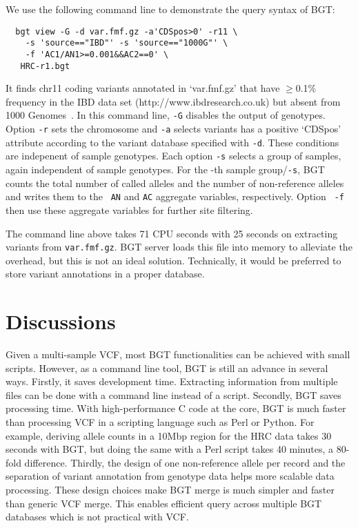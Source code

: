 \documentclass{bioinfo}
\begin{document}
We use the following command line to demonstrate the query syntax of BGT:
\begin{center}\footnotesize
\begin{verbatim}
  bgt view -G -d var.fmf.gz -a'CDSpos>0' -r11 \
    -s 'source=="IBD"' -s 'source=="1000G"' \
    -f 'AC1/AN1>=0.001&&AC2==0' \
   HRC-r1.bgt
\end{verbatim}
\end{center}
It finds chr11 coding variants annotated in `var.fmf.gz' that have $\ge$0.1\%
frequency in the IBD data set (http://www.ibdresearch.co.uk) but absent from
1000 Genomes~\citep{1000-Genomes-Project-Consortium:2012aa}. In this command line, {\tt -G} disables the output of genotypes.
Option {\tt -r} sets the chromosome and {\tt -a} selects variants has a
positive `CDSpos' attribute according to the variant database specified with
{\tt -d}.  These conditions are indepenent of sample genotypes. Each option
{\tt -s} selects a group of samples, again independent of sample genotypes.
For the -th sample group/{\tt -s}, BGT counts the total number of called
alleles and the number of non-reference alleles and writes them to the {\tt
AN\char35} and {\tt AC\char35} aggregate variables, respectively. Option {\tt
-f} then use these aggregate variables for further site filtering.

The command line above takes 71 CPU seconds with 25 seconds on extracting
variants from {\tt var.fmf.gz}. BGT server loads this file into memory to
alleviate the overhead, but this is not an ideal solution. Technically, it
would be preferred to store variant annotations in a proper database.

\section{Discussions}

Given a multi-sample VCF, most BGT functionalities can be achieved with small
scripts. However, as a command line tool, BGT is still an advance in several
ways. Firstly, it saves development time. Extracting information from multiple
files can be done with a command line instead of a script.  Secondly,
BGT saves processing time. With high-performance C code at the core, BGT is
much faster than processing VCF in a scripting language such as Perl or Python.
For example, deriving allele counts in a 10Mbp region for the HRC data takes 30
seconds with BGT, but doing the same with a Perl script takes 40 minutes, a
80-fold difference. Thirdly, the design of one non-reference allele per record
and the separation of variant annotation from genotype data helps more scalable
data processing. These design choices make BGT merge is much simpler and faster
than generic VCF merge. This enables efficient query across multiple BGT
databases which is not practical with VCF.
\end{document}

